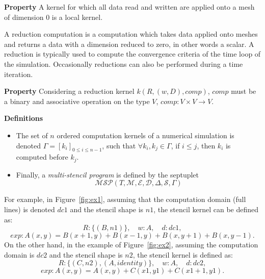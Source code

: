 \noindent \textbf{Property}
A kernel for which all data read and written are applied onto a mesh of dimension $0$ is a local kernel.

\medskip
A reduction computation is a computation which takes data applied onto meshes and returns a data with a dimension reduced to zero, in other words a scalar. A reduction is typically used to compute the convergence criteria of the time loop of the simulation. Occasionally reductions can also be performed during a time iteration. %

\noindent \textbf{Property}
Considering a reduction kernel $k(R,(w,D),comp)$, $comp$ must be a binary and associative operation on the type $V$, $comp: V \times V \rightarrow V$.

\noindent \textbf{Definitions}
\begin{itemize}
\item The set of $n$ ordered computation kernels of a numerical simulation is denoted $\Gamma = [k_i]_{0 \leq i \leq n-1}$, such that $\forall k_i,k_j \in \Gamma$, if $i \leq j$, then $k_i$ is computed before $k_j$.
\item Finally, a \textit{multi-stencil program} is defined by the septuplet 
\begin{equation*}
\mathcal{MSP}(T,\mathcal{M},\mathcal{E},\mathcal{D},\Delta, \mathcal{S},\Gamma)
\end{equation*}
\end{itemize}

For example, in Figure~\ref{fig:ex1}, assuming that the computation domain (full lines) is denoted $dc1$ and the stencil shape is $n1$, the stencil kernel can be defined as:
\begin{equation*}
R: \{(B,n1)\}, \quad w: A, \quad d: dc1,
\end{equation*}
\begin{equation*}
exp: A(x,y)=B(x+1,y)+B(x-1,y)+B(x,y+1)+B(x,y-1).
\end{equation*}
On the other hand, in the example of Figure~\ref{fig:ex2}, assuming the computation domain is $dc2$ and the stencil shape is $n2$, the stencil kernel is defined as:
\begin{equation*}
R: \{(C,n2),(A,identity)\}, \quad w: A, \quad d: dc2,
\end{equation*}
\begin{equation*}
exp: A(x,y)=A(x,y)+C(x1,y1)+C(x1+1,y1).
\end{equation*}

